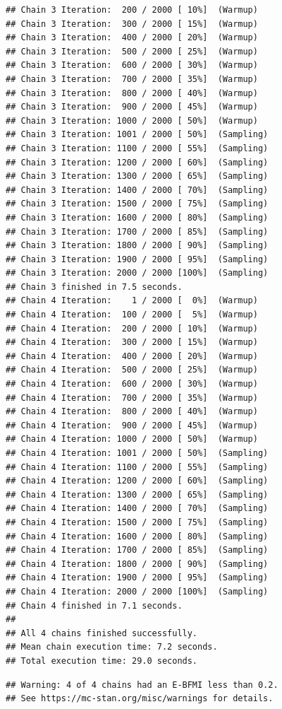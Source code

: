 \documentclass[
]{article}
\begin{document}
\begin{verbatim}
## Chain 3 Iteration:  200 / 2000 [ 10%]  (Warmup) 
## Chain 3 Iteration:  300 / 2000 [ 15%]  (Warmup) 
## Chain 3 Iteration:  400 / 2000 [ 20%]  (Warmup) 
## Chain 3 Iteration:  500 / 2000 [ 25%]  (Warmup) 
## Chain 3 Iteration:  600 / 2000 [ 30%]  (Warmup) 
## Chain 3 Iteration:  700 / 2000 [ 35%]  (Warmup) 
## Chain 3 Iteration:  800 / 2000 [ 40%]  (Warmup) 
## Chain 3 Iteration:  900 / 2000 [ 45%]  (Warmup) 
## Chain 3 Iteration: 1000 / 2000 [ 50%]  (Warmup) 
## Chain 3 Iteration: 1001 / 2000 [ 50%]  (Sampling) 
## Chain 3 Iteration: 1100 / 2000 [ 55%]  (Sampling) 
## Chain 3 Iteration: 1200 / 2000 [ 60%]  (Sampling) 
## Chain 3 Iteration: 1300 / 2000 [ 65%]  (Sampling) 
## Chain 3 Iteration: 1400 / 2000 [ 70%]  (Sampling) 
## Chain 3 Iteration: 1500 / 2000 [ 75%]  (Sampling) 
## Chain 3 Iteration: 1600 / 2000 [ 80%]  (Sampling) 
## Chain 3 Iteration: 1700 / 2000 [ 85%]  (Sampling) 
## Chain 3 Iteration: 1800 / 2000 [ 90%]  (Sampling) 
## Chain 3 Iteration: 1900 / 2000 [ 95%]  (Sampling) 
## Chain 3 Iteration: 2000 / 2000 [100%]  (Sampling) 
## Chain 3 finished in 7.5 seconds.
## Chain 4 Iteration:    1 / 2000 [  0%]  (Warmup) 
## Chain 4 Iteration:  100 / 2000 [  5%]  (Warmup) 
## Chain 4 Iteration:  200 / 2000 [ 10%]  (Warmup) 
## Chain 4 Iteration:  300 / 2000 [ 15%]  (Warmup) 
## Chain 4 Iteration:  400 / 2000 [ 20%]  (Warmup) 
## Chain 4 Iteration:  500 / 2000 [ 25%]  (Warmup) 
## Chain 4 Iteration:  600 / 2000 [ 30%]  (Warmup) 
## Chain 4 Iteration:  700 / 2000 [ 35%]  (Warmup) 
## Chain 4 Iteration:  800 / 2000 [ 40%]  (Warmup) 
## Chain 4 Iteration:  900 / 2000 [ 45%]  (Warmup) 
## Chain 4 Iteration: 1000 / 2000 [ 50%]  (Warmup) 
## Chain 4 Iteration: 1001 / 2000 [ 50%]  (Sampling) 
## Chain 4 Iteration: 1100 / 2000 [ 55%]  (Sampling) 
## Chain 4 Iteration: 1200 / 2000 [ 60%]  (Sampling) 
## Chain 4 Iteration: 1300 / 2000 [ 65%]  (Sampling) 
## Chain 4 Iteration: 1400 / 2000 [ 70%]  (Sampling) 
## Chain 4 Iteration: 1500 / 2000 [ 75%]  (Sampling) 
## Chain 4 Iteration: 1600 / 2000 [ 80%]  (Sampling) 
## Chain 4 Iteration: 1700 / 2000 [ 85%]  (Sampling) 
## Chain 4 Iteration: 1800 / 2000 [ 90%]  (Sampling) 
## Chain 4 Iteration: 1900 / 2000 [ 95%]  (Sampling) 
## Chain 4 Iteration: 2000 / 2000 [100%]  (Sampling) 
## Chain 4 finished in 7.1 seconds.
## 
## All 4 chains finished successfully.
## Mean chain execution time: 7.2 seconds.
## Total execution time: 29.0 seconds.
\end{verbatim}

\begin{verbatim}
## Warning: 4 of 4 chains had an E-BFMI less than 0.2.
## See https://mc-stan.org/misc/warnings for details.
\end{verbatim}
\end{document}
